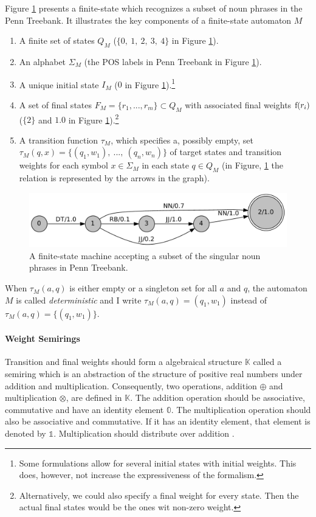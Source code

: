 Figure \ref{fig:np-fsm} presents a finite-state which recognizes a
subset of noun phrases in the Penn Treebank. It illustrates the key
components of a finite-state automaton $M$
\begin{enumerate}
\item A finite set of states $Q_M$ ($\{0,\ 1,\ 2,\ 3,\ 4\}$ in Figure \ref{fig:np-fsm}).
\item An alphabet $\Sigma_M$ (the POS labels in Penn Treebank in Figure \ref{fig:np-fsm}).
\item A unique initial state $I_M$ ($0$ in Figure \ref{fig:np-fsm}).\footnote{Some formulations allow for several initial states with initial weights. This does, however, not increase the expressiveness of the formalism.}
\item A set of final states $F_M = \{r_1, ..., r_m\} \subset Q_M$ with associated final weights ${\rm f}(r_i)$ ($\{2\}$ and $1.0$ in Figure \ref{fig:np-fsm}).\footnote{Alternatively, we could also specify a final weight for every state. Then the actual final states would be the ones wit non-zero weight.}
\item A transition function $\tau_M$, which specifies a, possibly empty, set $\tau_M(q,x) = \{(q_1,w_1),\ ...,\ (q_n,w_n)\}$ of target states and transition weights for each symbol $x\in \Sigma_M$ in each state $q \in Q_M$ (in Figure, \ref{fig:np-fsm} the relation is represented by the arrows in the graph).
\end{enumerate}
\begin{figure}[!ftb]
\begin{center}
\includegraphics[scale=.7]{np}
\end{center}
\caption{A finite-state machine accepting a subset of the singular noun phrases in Penn Treebank.}\label{fig:np-fsm}
\end{figure}
When $\tau_M(a,q)$ is either empty or a singleton set for all $a$ and $q$, the automaton $M$ is called {\it deterministic} and I write $\tau_M(a,q) = (q_1,w_1)$ instead of $\tau_M(a,q) = \{(q_1,w_1)\}$.

\paragraph{Weight Semirings} Transition and final weights should form a
algebraical structure $\mathbb{K}$ called a semiring which is an abstraction of the
structure of positive real numbers under addition and multiplication. Consequently, two operations, addition $\oplus$ and
multiplication $\otimes$, are defined in $\mathbb{K}$. The addition operation should be
associative, commutative and have an identity element
$\mathbb{0}$. The multiplication operation should also be associative
and commutative. If it has an identity element, that element is
denoted by $\mathbb{1}$. Multiplication should distribute over
addition \citep{Allauzen2007}.

